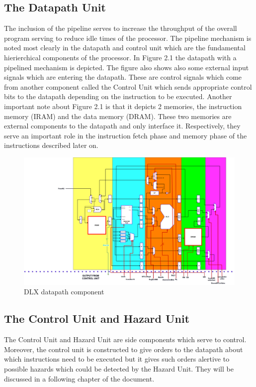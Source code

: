 	\subsection{ The Datapath Unit }
    \indent The inclusion of the pipeline serves to increase the throughput of the overall program serving to reduce idle times of the processor. 
    The pipeline mechanism is noted most clearly in the datapath and control unit which are the fundamental hierierchical components of the processor.
    In Figure 2.1 the datapath with a pipelined mechanism is depicted. The figure also shows also some external input signals which are entering the datapath. 
	These are control signals which come from another component called the Control Unit which sends appropriate control bits to the datapath depending on the instruction to be executed.
	Another important note about Figure 2.1 is that it depicts 2 memories, the instruction memory (IRAM) and the data memory (DRAM). These two memories
	are external components to the datapath and only interface it. Respectively, they serve an important role in the instruction fetch phase and memory phase of the instructions described later on.
    \begin{figure}[h!]
        \centering
        \includegraphics[scale = 0.15]
		{chapters/figures/DataPathUpdate}
        \caption{DLX datapath component}
        \label{fig:datapathPic}
        \end{figure}

	\subsection{ The Control Unit and Hazard Unit }
	The Control Unit and Hazard Unit are side components which serve to control. Moreover, the control unit is constructed to give orders to the
	datapath about which instructions need to be executed but it gives such orders alertive to possible hazards which could be detected by the Hazard Unit. They will be discussed in a following chapter of the document.

